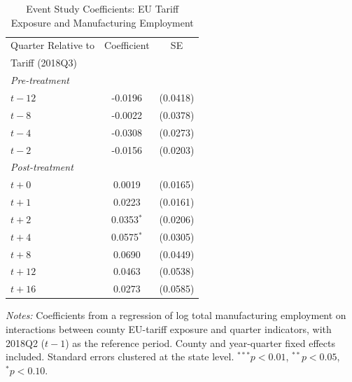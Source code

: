 \begin{table}[htbp]
\centering
\caption{Event Study Coefficients: EU Tariff Exposure and Manufacturing Employment}
\label{tab:eventstudy}
\begin{tabular}{lcc}
\toprule
Quarter Relative to & Coefficient & SE \\
Tariff (2018Q3) & & \\
\midrule
\textit{Pre-treatment} & & \\
$t-12$ & -0.0196 & (0.0418) \\
$t-8$ & -0.0022 & (0.0378) \\
$t-4$ & -0.0308 & (0.0273) \\
$t-2$ & -0.0156 & (0.0203) \\
\midrule
\textit{Post-treatment} & & \\
$t+0$ & 0.0019 & (0.0165) \\
$t+1$ & 0.0223 & (0.0161) \\
$t+2$ & 0.0353$^{*}$ & (0.0206) \\
$t+4$ & 0.0575$^{*}$ & (0.0305) \\
$t+8$ & 0.0690 & (0.0449) \\
$t+12$ & 0.0463 & (0.0538) \\
$t+16$ & 0.0273 & (0.0585) \\
\bottomrule
\end{tabular}
\begin{tablenotes}[flushleft]
\small
\item \textit{Notes:} Coefficients from a regression of log total manufacturing employment on interactions between county EU-tariff exposure and quarter indicators, with 2018Q2 ($t-1$) as the reference period. County and year-quarter fixed effects included. Standard errors clustered at the state level. $^{***}p<0.01$, $^{**}p<0.05$, $^{*}p<0.10$.
\end{tablenotes}
\end{table}
